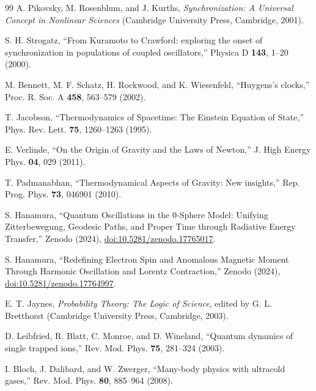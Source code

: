 \documentclass[%
 reprint,
 amsmath,amssymb,
 aps,
 prb,
]{revtex4-2}
\numberwithin{equation}{section}
\begin{document}
\begin{thebibliography}{99}
A. Pikovsky, M. Rosenblum, and J. Kurths, \textit{Synchronization: A Universal Concept in Nonlinear Sciences} (Cambridge University Press, Cambridge, 2001).

S. H. Strogatz, ``From Kuramoto to Crawford: exploring the onset of synchronization in populations of coupled oscillators,'' Physica D \textbf{143}, 1--20 (2000).

M. Bennett, M. F. Schatz, H. Rockwood, and K. Wiesenfeld, ``Huygens's clocks,'' Proc. R. Soc. A \textbf{458}, 563--579 (2002).

T. Jacobson, ``Thermodynamics of Spacetime: The Einstein Equation of State,'' Phys. Rev. Lett. \textbf{75}, 1260--1263 (1995).

E. Verlinde, ``On the Origin of Gravity and the Laws of Newton,'' J. High Energy Phys. \textbf{04}, 029 (2011).

T. Padmanabhan, ``Thermodynamical Aspects of Gravity: New insights,'' Rep. Prog. Phys. \textbf{73}, 046901 (2010).

S. Hanamura, ``Quantum Oscillations in the 0-Sphere Model: Unifying Zitterbewegung, Geodesic Paths, and Proper Time through Radiative Energy Transfer,'' Zenodo (2024), \href{https://doi.org/10.5281/zenodo.17765017}{doi:10.5281/zenodo.17765017}.

S. Hanamura, ``Redefining Electron Spin and Anomalous Magnetic Moment Through Harmonic Oscillation and Lorentz Contraction,'' Zenodo (2024), \href{https://doi.org/10.5281/zenodo.17764997}{doi:10.5281/zenodo.17764997}.

E. T. Jaynes, \textit{Probability Theory: The Logic of Science}, edited by G. L. Bretthorst (Cambridge University Press, Cambridge, 2003).

D. Leibfried, R. Blatt, C. Monroe, and D. Wineland, ``Quantum dynamics of single trapped ions,'' Rev. Mod. Phys. \textbf{75}, 281--324 (2003).

I. Bloch, J. Dalibard, and W. Zwerger, ``Many-body physics with ultracold gases,'' Rev. Mod. Phys. \textbf{80}, 885--964 (2008).


\end{thebibliography}
\end{document}
